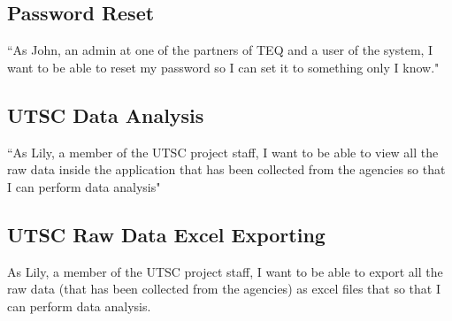 \documentclass[12pt]{article}
\begin{document}
\subsection{Password Reset}
``As John, an admin at one of the partners of TEQ and a user of the system, I want to be able to reset my password so I can set it to something only I know."

\subsection{UTSC Data Analysis}
``As Lily, a member of the UTSC project staff, I want to be able to view all the raw data inside the application that has been collected from the agencies so that I can perform data analysis" 

\subsection{UTSC Raw Data Excel Exporting }
As Lily, a member of the UTSC project staff, I want to be able to export all the raw data (that has been collected from the agencies) as excel files that so that I can perform data analysis. 

\newpage


\end{document}
